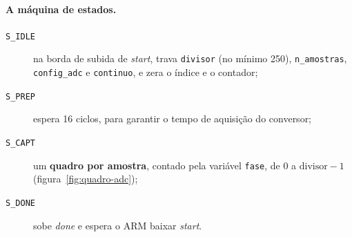 \documentclass[11pt,a4paper,oneside]{article}
\begin{document}
\paragraph{A máquina de estados.}
\begin{description}
\item[\texttt{S\_IDLE}] na borda de subida de \emph{start}, trava
  \texttt{divisor} (no mínimo 250), \texttt{n\_amostras}, \texttt{config\_adc}
  e \texttt{continuo}, e zera o índice e o contador;
\item[\texttt{S\_PREP}] espera 16 ciclos, para garantir o tempo de aquisição
  do conversor;
\item[\texttt{S\_CAPT}] um \textbf{quadro por amostra}, contado pela variável
  \texttt{fase}, de 0 a $\text{divisor}-1$ (figura~\ref{fig:quadro-adc});
\item[\texttt{S\_DONE}] sobe \emph{done} e espera o ARM baixar \emph{start}.
\end{description}
\end{document}
